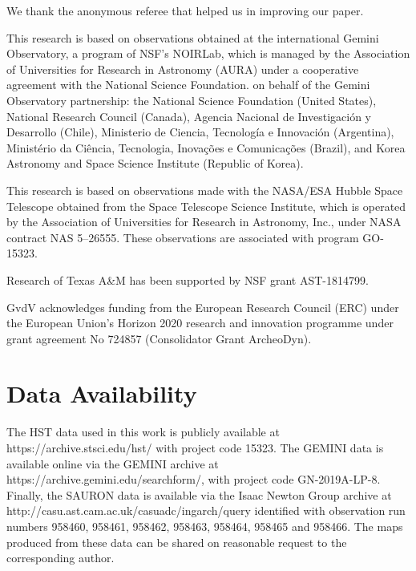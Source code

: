 \documentclass[fleqn,usenatbib]{mnras}
\begin{document}
We thank the anonymous referee that helped us in improving our paper.

This research is based on observations obtained at the international Gemini Observatory, a program of NSF’s NOIRLab, which is managed by the Association of Universities for Research in Astronomy (AURA) under a cooperative agreement with the National Science Foundation. on behalf of the Gemini Observatory partnership: the National Science Foundation (United States), National Research Council (Canada), Agencia Nacional de Investigaci\'{o}n y Desarrollo (Chile), Ministerio de Ciencia, Tecnolog\'{i}a e Innovaci\'{o}n (Argentina), Minist\'{e}rio da Ci\^{e}ncia, Tecnologia, Inova\c{c}\~{o}es e Comunica\c{c}\~{o}es (Brazil), and Korea Astronomy and Space Science Institute (Republic of Korea).

This research is based on observations made with the NASA/ESA Hubble Space Telescope obtained from the Space Telescope Science Institute, which is operated by the Association of Universities for Research in Astronomy, Inc., under NASA contract NAS 5–26555. These observations are associated with program GO-15323.

Research of Texas A\&M has been supported by NSF grant AST-1814799.

GvdV acknowledges funding from the European Research Council (ERC) under the European Union's Horizon 2020 research and innovation programme under grant agreement No 724857 (Consolidator Grant ArcheoDyn).


\section*{Data Availability}


The HST data used in this work is publicly available at https://archive.stsci.edu/hst/ with project code 15323. The GEMINI data is available online via the GEMINI archive at https://archive.gemini.edu/searchform/, with project code GN-2019A-LP-8. Finally, the SAURON data is available via the Isaac Newton Group archive at http://casu.ast.cam.ac.uk/casuadc/ingarch/query identified with observation run numbers 958460, 958461, 958462, 958463, 958464, 958465 and 958466. The maps produced from these data can be shared on reasonable request to the corresponding author.




\end{document}
